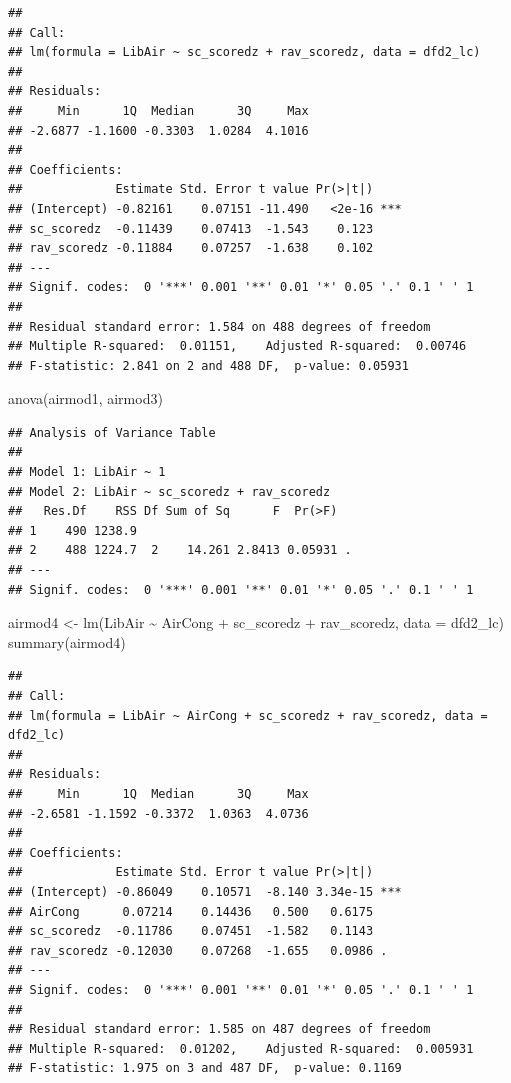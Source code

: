 \documentclass[
]{article}
\newenvironment{Shaded}{\begin{snugshade}}{\end{snugshade}}
\newcommand{\AttributeTok}[1]{\textcolor[rgb]{0.77,0.63,0.00}{#1}}
\newcommand{\FunctionTok}[1]{\textcolor[rgb]{0.00,0.00,0.00}{#1}}
\newcommand{\NormalTok}[1]{#1}
\newcommand{\OtherTok}[1]{\textcolor[rgb]{0.56,0.35,0.01}{#1}}
\newcommand{\SpecialCharTok}[1]{\textcolor[rgb]{0.00,0.00,0.00}{#1}}
\begin{document}
\begin{verbatim}
## 
## Call:
## lm(formula = LibAir ~ sc_scoredz + rav_scoredz, data = dfd2_lc)
## 
## Residuals:
##     Min      1Q  Median      3Q     Max 
## -2.6877 -1.1600 -0.3303  1.0284  4.1016 
## 
## Coefficients:
##             Estimate Std. Error t value Pr(>|t|)    
## (Intercept) -0.82161    0.07151 -11.490   <2e-16 ***
## sc_scoredz  -0.11439    0.07413  -1.543    0.123    
## rav_scoredz -0.11884    0.07257  -1.638    0.102    
## ---
## Signif. codes:  0 '***' 0.001 '**' 0.01 '*' 0.05 '.' 0.1 ' ' 1
## 
## Residual standard error: 1.584 on 488 degrees of freedom
## Multiple R-squared:  0.01151,    Adjusted R-squared:  0.00746 
## F-statistic: 2.841 on 2 and 488 DF,  p-value: 0.05931
\end{verbatim}

\begin{Shaded}
\begin{Highlighting}[]
\FunctionTok{anova}\NormalTok{(airmod1, airmod3)}
\end{Highlighting}
\end{Shaded}

\begin{verbatim}
## Analysis of Variance Table
## 
## Model 1: LibAir ~ 1
## Model 2: LibAir ~ sc_scoredz + rav_scoredz
##   Res.Df    RSS Df Sum of Sq      F  Pr(>F)  
## 1    490 1238.9                              
## 2    488 1224.7  2    14.261 2.8413 0.05931 .
## ---
## Signif. codes:  0 '***' 0.001 '**' 0.01 '*' 0.05 '.' 0.1 ' ' 1
\end{verbatim}

\begin{Shaded}
\begin{Highlighting}[]
\NormalTok{airmod4 }\OtherTok{\textless{}{-}} \FunctionTok{lm}\NormalTok{(LibAir }\SpecialCharTok{\textasciitilde{}}\NormalTok{ AirCong }\SpecialCharTok{+}\NormalTok{ sc\_scoredz }\SpecialCharTok{+}\NormalTok{ rav\_scoredz, }\AttributeTok{data =}\NormalTok{ dfd2\_lc)}
\FunctionTok{summary}\NormalTok{(airmod4)}
\end{Highlighting}
\end{Shaded}

\begin{verbatim}
## 
## Call:
## lm(formula = LibAir ~ AirCong + sc_scoredz + rav_scoredz, data = dfd2_lc)
## 
## Residuals:
##     Min      1Q  Median      3Q     Max 
## -2.6581 -1.1592 -0.3372  1.0363  4.0736 
## 
## Coefficients:
##             Estimate Std. Error t value Pr(>|t|)    
## (Intercept) -0.86049    0.10571  -8.140 3.34e-15 ***
## AirCong      0.07214    0.14436   0.500   0.6175    
## sc_scoredz  -0.11786    0.07451  -1.582   0.1143    
## rav_scoredz -0.12030    0.07268  -1.655   0.0986 .  
## ---
## Signif. codes:  0 '***' 0.001 '**' 0.01 '*' 0.05 '.' 0.1 ' ' 1
## 
## Residual standard error: 1.585 on 487 degrees of freedom
## Multiple R-squared:  0.01202,    Adjusted R-squared:  0.005931 
## F-statistic: 1.975 on 3 and 487 DF,  p-value: 0.1169
\end{verbatim}
\end{document}
